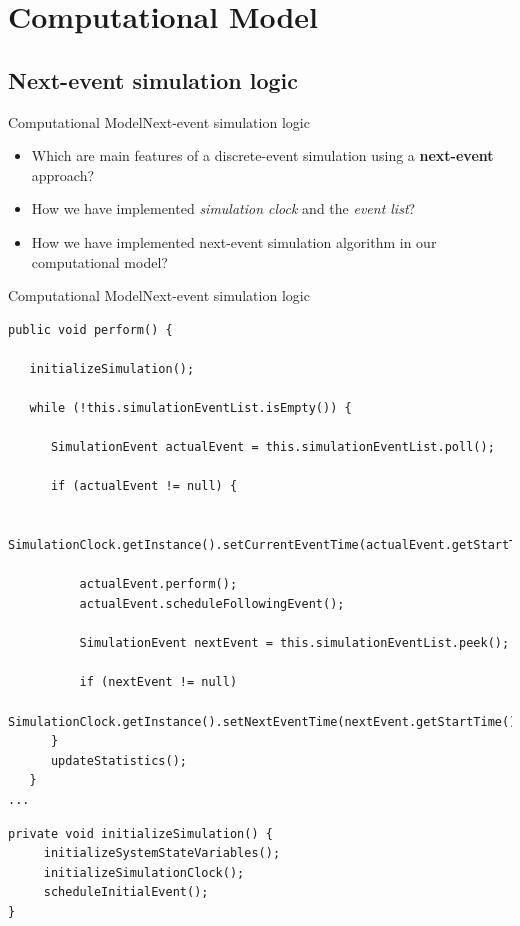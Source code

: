 \documentclass[10pt]{beamer}
\begin{document}
\section{Computational Model}


\subsection{Next-event simulation logic}

\begin{frame}{Computational Model}{Next-event simulation logic}

\begin{itemize}
\item Which are main features of a discrete-event simulation using a \textbf{next-event} approach?

\item How we have implemented \textit{simulation clock} and the \textit{event list}?

\item How we have implemented next-event simulation algorithm in our computational model?
\end{itemize}

\end{frame}

\begin{frame}[fragile]{Computational Model}{Next-event simulation logic}

\begin{lstlisting}[frame=lines, caption={\texttt{ComputationalModel.perform} method}]
public void perform() {

   initializeSimulation();
   
   while (!this.simulationEventList.isEmpty()) {

      SimulationEvent actualEvent = this.simulationEventList.poll();

      if (actualEvent != null) {

          SimulationClock.getInstance().setCurrentEventTime(actualEvent.getStartTime());

          actualEvent.perform();
          actualEvent.scheduleFollowingEvent();

          SimulationEvent nextEvent = this.simulationEventList.peek();

          if (nextEvent != null)
              SimulationClock.getInstance().setNextEventTime(nextEvent.getStartTime());
      }
      updateStatistics();
   }
...
\end{lstlisting}

\begin{lstlisting}[frame=lines, caption={\texttt{ComputationalModel.initializeSimulation} method}]
private void initializeSimulation() {
     initializeSystemStateVariables();
     initializeSimulationClock();
     scheduleInitialEvent();
}
\end{lstlisting}
\end{frame}
\end{document}
